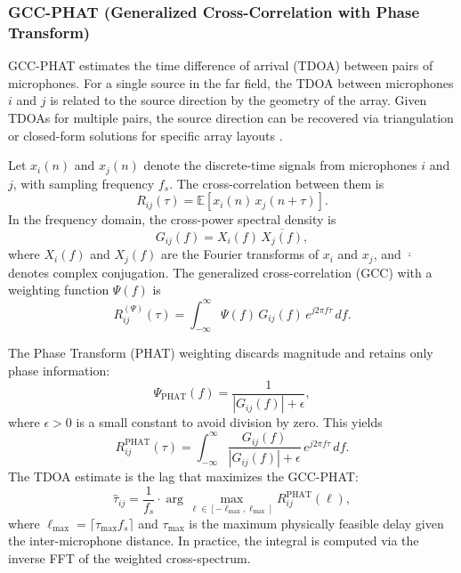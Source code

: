 \documentclass[12pt, titlepage]{article}
\begin{document}
\subsubsection{GCC-PHAT (Generalized Cross-Correlation with Phase Transform)}
\label{sec:gccphat}

GCC-PHAT estimates the time difference of arrival (TDOA) between pairs of
microphones. For a single source in the far field, the TDOA between microphones
$i$ and $j$ is related to the source direction by the geometry of the array.
Given TDOAs for multiple pairs, the source direction can be recovered via
triangulation or closed-form solutions for specific array layouts
\cite{Knapp1976GCC}.

Let $x_i(n)$ and $x_j(n)$ denote the discrete-time signals from microphones
$i$ and $j$, with sampling frequency $f_s$. The cross-correlation between them
is
\begin{equation}
  R_{ij}(\tau) = \mathbb{E}\left[ x_i(n) \, x_j(n + \tau) \right].
\end{equation}
In the frequency domain, the cross-power spectral density is
\begin{equation}
  G_{ij}(f) = X_i(f) \, \overline{X_j(f)},
\end{equation}
where $X_i(f)$ and $X_j(f)$ are the Fourier transforms of $x_i$ and $x_j$, and
$\overline{\cdot}$ denotes complex conjugation. The generalized
cross-correlation (GCC) with a weighting function $\Psi(f)$ is
\begin{equation}
  R_{ij}^{(\Psi)}(\tau) = \int_{-\infty}^{\infty} \Psi(f) \, G_{ij}(f) \,
  e^{j 2\pi f \tau} \, df.
\end{equation}

The Phase Transform (PHAT) weighting discards magnitude and retains only phase
information:
\begin{equation}
  \Psi_{\mathrm{PHAT}}(f) = \frac{1}{\left| G_{ij}(f) \right| + \epsilon},
\end{equation}
where $\epsilon > 0$ is a small constant to avoid division by zero. This
yields
\begin{equation}
  R_{ij}^{\mathrm{PHAT}}(\tau) = \int_{-\infty}^{\infty}
  \frac{G_{ij}(f)}{\left| G_{ij}(f) \right| + \epsilon} \,
  e^{j 2\pi f \tau} \, df.
\end{equation}
The TDOA estimate is the lag that maximizes the GCC-PHAT:
\begin{equation}
  \hat{\tau}_{ij} = \frac{1}{f_s} \cdot \arg\max_{\ell \in [-\ell_{\max},
  \ell_{\max}]} R_{ij}^{\mathrm{PHAT}}(\ell),
\end{equation}
where $\ell_{\max} = \lceil \tau_{\max} f_s \rceil$ and $\tau_{\max}$ is the
maximum physically feasible delay given the inter-microphone distance. In
practice, the integral is computed via the inverse FFT of the weighted
cross-spectrum.
\end{document}
